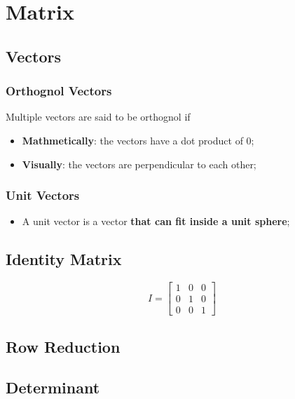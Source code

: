\chapter{Matrix}

\section{Vectors}

  \subsection{Orthognol Vectors}

    Multiple vectors are said to be orthognol if
    \begin{itemize}
      \item \textbf{Mathmetically}: the vectors have a dot product of 0;
      \item \textbf{Visually}: the vectors are perpendicular to each other;
    \end{itemize}
    
  \subsection{Unit Vectors}
  
    \begin{itemize}
      \item A unit vector is a vector \textbf{that can fit inside a unit sphere};
    \end{itemize}

\section{Identity Matrix}

  \begin{equation}
    I = 
    \begin{bmatrix}
      1 & 0 & 0 \\ 
      0 & 1 & 0 \\
      0 & 0 & 1
    \end{bmatrix}
  \end{equation}
  
\section{Row Reduction}
  
\section{Determinant}


